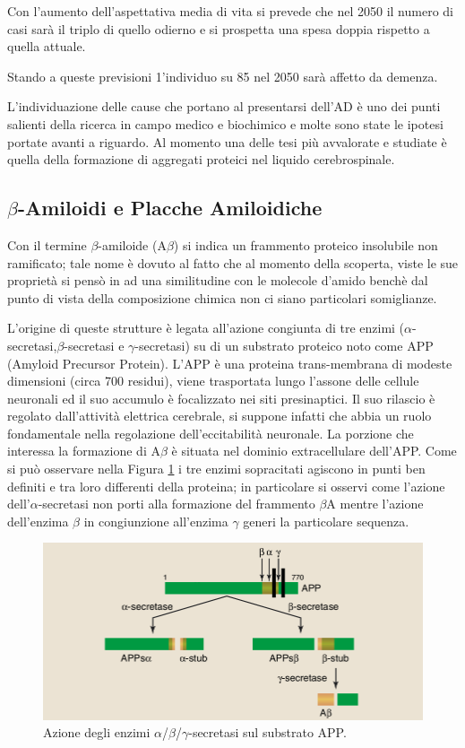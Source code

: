 \documentclass[a4paper, 12pt]{article}
\begin{document}
Con l'aumento dell'aspettativa media di vita si prevede che nel 2050 il numero di casi sarà il triplo di quello odierno e si prospetta una spesa doppia rispetto a quella attuale.\cite{noauthor_world_2018}

Stando a queste previsioni 1'individuo su 85 nel 2050 sarà affetto da demenza.

L'individuazione delle cause che portano al presentarsi dell'AD è uno dei punti salienti della ricerca in campo medico e biochimico e molte sono state le ipotesi portate avanti a riguardo. Al momento una delle tesi più avvalorate e studiate è quella della formazione di aggregati proteici nel liquido cerebrospinale.

\subsection{$\beta$-Amiloidi e Placche Amiloidiche}
\label{sec:ab}
Con il termine $\beta$-amiloide (A$\beta$) si indica un frammento proteico insolubile non ramificato; tale nome è dovuto al fatto che al momento della scoperta, viste le sue proprietà si pensò in ad una similitudine con le molecole d'amido benchè dal punto di vista della composizione chimica non ci siano particolari somiglianze.\cite{lennarz_encyclopedia_2004}

L'origine di queste strutture è legata all'azione congiunta di tre enzimi ($\alpha$-secretasi,$\beta$-secretasi e $\gamma$-secretasi) su di un substrato proteico noto come APP (Amyloid Precursor Protein). L'APP è una proteina trans-membrana di modeste dimensioni (circa 700 residui), viene trasportata lungo l'assone delle cellule neuronali ed il suo accumulo è focalizzato nei siti presinaptici. Il suo rilascio è regolato dall'attività elettrica cerebrale, si suppone infatti che abbia un ruolo fondamentale nella regolazione dell'eccitabilità neuronale.\cite{mattson_cellular_1997}
La porzione che interessa la formazione di A$\beta$ è situata nel dominio extracellulare dell'APP. Come si può osservare nella Figura \ref{fig:app} i tre enzimi sopracitati agiscono in punti ben definiti e tra loro differenti della proteina; in particolare si osservi come l'azione dell'$\alpha$-secretasi non porti alla formazione del frammento $\beta$A mentre l'azione dell'enzima $\beta$ in congiunzione all'enzima $\gamma$ generi la particolare sequenza.\cite{goedert_century_2006}

\begin{figure}[H]
	\includegraphics[width=\linewidth]{immagini/APP.png}
	\caption{Azione degli enzimi $\alpha$/$\beta$/$\gamma$-secretasi sul substrato APP.}
	\label{fig:app}
\end{figure}
\end{document}
